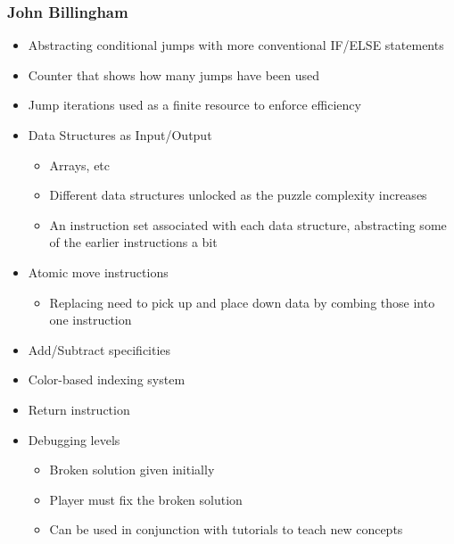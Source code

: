 \subsubsection{John Billingham}
\begin{itemize}
  \item Abstracting conditional jumps with more conventional IF/ELSE statements
  \item Counter that shows how many jumps have been used
  \item Jump iterations used as a finite resource to enforce efficiency
  \item Data Structures as Input/Output
  \begin{itemize}
    \item Arrays, etc
    \item Different data structures unlocked as the puzzle complexity increases
    \item An instruction set associated with each data structure, abstracting
    some of the earlier instructions a bit
  \end{itemize}
  \item Atomic move instructions
  \begin{itemize}
    \item Replacing need to pick up and place down data by combing those into
    one instruction
  \end{itemize}
  \item Add/Subtract specificities
  \item Color-based indexing system
  \item Return instruction
  \item Debugging levels
  \begin{itemize}
    \item Broken solution given initially
    \item Player must fix the broken solution
    \item Can be used in conjunction with tutorials to teach new concepts
  \end{itemize}
\end{itemize}


